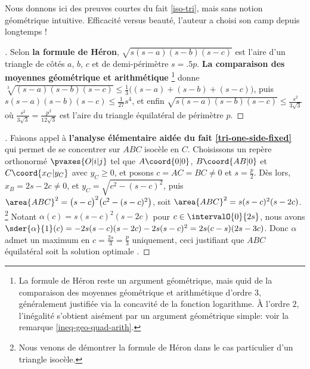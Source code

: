 \leavevmode

\smallskip

Nous donnons ici des preuves courtes du fait \ref{iso-tri}, mais sans notion géométrique intuitive. Efficacité versus beauté, l'auteur a choisi son camp depuis longtemps !




\begin{proof}[]
    Selon \textbf{la formule de Héron},
    $\sqrt{s(s - a)(s - b)(s - c)}$
    est l'aire d'un triangle de côtés $a$, $b$, $c$ et de demi-périmètre $s = \num{.5} p$.
    \textbf{La comparaison des moyennes géométrique et arithmétique}%
    \footnote{
        La formule de Héron reste un argument géométrique, mais quid de la comparaison des moyennes géométrique et arithmétique d'ordre $3$, généralement justifiée via la concavité de la fonction logarithme.
        À l'ordre $2$, l'inégalité s'obtient aisément par un argument géométrique simple: voir la remarque \ref{ineq-geo-quad-arith}.
    }
    donne
    $\sqrt[3]{(s - a)(s - b)(s - c)} \leq \frac13 \big( (s - a) + (s - b) + (s - c) \big)$,
    puis
    $s(s - a)(s - b)(s - c) \leq \frac{1}{27} s^4$,
    et enfin
    $\sqrt{s(s - a)(s - b)(s - c)} \leq \frac{s^2}{3 \sqrt{3}}$
    où $\frac{s^2}{3 \sqrt{3}} = \frac{p^2}{12 \sqrt{3}}$ est l'aire du triangle équilatéral de périmètre $p$.
\end{proof}




\begin{proof}[]
    Faisons appel à \textbf{l'analyse élémentaire aidée du fait \ref{tri-one-side-fixed}} qui permet de se concentrer sur $ABC$ isocèle en $C$.
    Choisissons un repère orthonormé $\pvaxes{O | i | j}$ tel que  $A\coord{0 | 0}$, $B\coord{AB | 0}$ et $C\coord{x_C | y_C}$ avec $y_C \geq 0$, et posons $c = AC = BC \neq 0$ et $s = \frac{p}{2}$.
    Dès lors,
    $x_B = 2 s - 2 c \neq 0$, et
    $y_C = \sqrt{c^2 - (s - c)^2}$,
    puis
    $\area{ABC}^2 = \big( s - c \big)^2 \big( c^2 - (s - c)^2 \big)$,
    soit
    $\area{ABC}^2 = s (s - c)^2 (s - 2 c)$.%
    \footnote{
        Nous venons de démontrer la formule de Héron dans le cas particulier d'un triangle isocèle.
    }
    Notant $\alpha(c) = s (s - c)^2 (s - 2 c)$ pour $c \in \intervalO{0}{2 s}$, nous avons $\sder{\alpha}{1}(c) = - 2 s (s - c) (s - 2 c) - 2 s (s - c)^2 = 2 s (c - s) (2s - 3c)$.
    Donc $\alpha$ admet un maximum en $c = \frac{2s}{3} = \frac{p}{3}$ uniquement,
    ceci justifiant que $ABC$ équilatéral soit la solution \og optimale \fg.
\end{proof}


